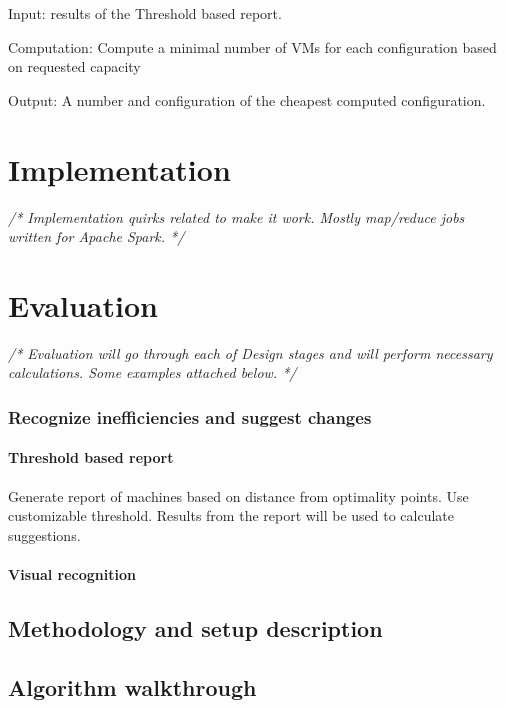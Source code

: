 \documentclass[]{final_report}
\begin{document}
Input: results of the Threshold based report.

Computation: Compute a minimal number of VMs for each configuration based on requested capacity

Output: A number and configuration of the cheapest computed configuration.


\chapter{Implementation}

\emph{/* Implementation quirks related to make it work. Mostly map/reduce jobs written for Apache Spark. */}


\chapter{Evaluation}

\emph{/* Evaluation will go through each of Design stages and will perform necessary calculations. Some examples attached below. */}

\subsection{Recognize inefficiencies and suggest changes}

\subsubsection{Threshold based report}

Generate report of machines based on distance from optimality points. Use customizable threshold. 
Results from the report will be used to calculate suggestions.

\subsubsection{Visual recognition}



\section{Methodology and setup description}

\section{Algorithm walkthrough}
\end{document}
